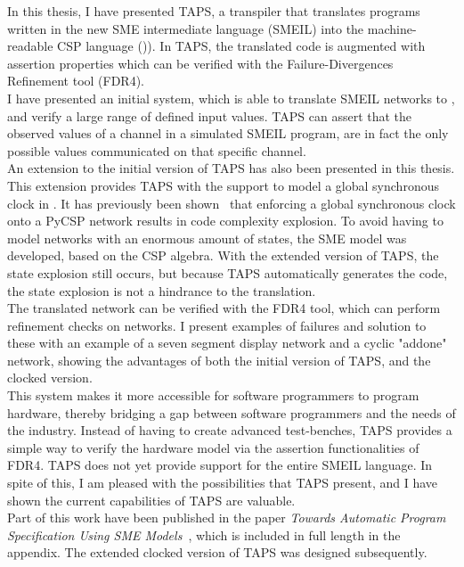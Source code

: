 In this thesis, I have presented TAPS, a transpiler that translates programs written in the
new SME intermediate language (SMEIL) into the machine-readable CSP language ()\cspm{}). In TAPS, the translated \cspm{} code is augmented with assertion
properties which can be verified with the Failure-Divergences Refinement tool
(FDR4).\\
I have presented an initial system, which is able to translate SMEIL networks to
\cspm{}, and verify a large range of defined input values. TAPS can assert that
the observed values of a channel in a simulated SMEIL program, are in fact the
only possible values communicated on that specific channel. \\

An extension to the initial version of TAPS has also been presented in this
thesis. This extension provides TAPS with the support to model a global
synchronous clock in \cspm{}. It has previously been shown~\cite{Skaarup14}
that enforcing a global synchronous clock onto a PyCSP network results in code complexity explosion. To avoid having to model networks with an enormous amount of
states, the SME model was developed, based on the CSP algebra. With the
extended version of TAPS, the state explosion still occurs, but because TAPS automatically generates the \cspm{} code, the state explosion is not a hindrance to the
translation.\\

The translated \cspm{} network can be verified with the FDR4 tool, which can
perform refinement checks on \cspm{} networks. I present examples of failures
and solution to these with an example of a seven segment display network and a
cyclic "addone" network, showing the advantages of both the initial version of TAPS, and the clocked version.\\

This system makes it more accessible for software programmers to program
hardware, thereby bridging a gap between software programmers and the needs
of the industry.
Instead of having to create advanced test-benches, TAPS provides a simple
way to verify the hardware model via the assertion functionalities of FDR4.
TAPS does not yet provide support for the entire SMEIL language. In spite of this,
I am pleased with the possibilities that TAPS present, and I have shown the current capabilities of TAPS are valuable.\\

Part of this work have been published in the paper \textit{Towards Automatic Program Specification Using SME Models}~\cite{TheglerEtAl2018}, which is included in full length in the appendix. The extended clocked version of TAPS was designed subsequently.
